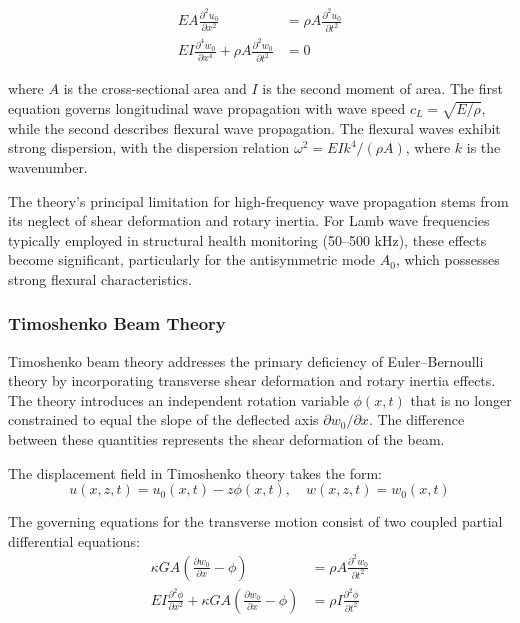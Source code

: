 \documentclass[12pt,a4paper]{report}
\begin{document}
\begin{align}
EA \frac{\partial^2 u_0}{\partial x^2} &= \rho A \frac{\partial^2 u_0}{\partial t^2} \label{eq:EB_axial}\\
EI \frac{\partial^4 w_0}{\partial x^4} + \rho A \frac{\partial^2 w_0}{\partial t^2} &= 0 \label{eq:EB_bending}
\end{align}

where $A$ is the cross-sectional area and $I$ is the second moment of area. The first equation governs longitudinal wave propagation with wave speed $c_L = \sqrt{E/\rho}$, while the second describes flexural wave propagation. The flexural waves exhibit strong dispersion, with the dispersion relation $\omega^2 = EI k^4 / (\rho A)$, where $k$ is the wavenumber.

The theory's principal limitation for high-frequency wave propagation stems from its neglect of shear deformation and rotary inertia. For Lamb wave frequencies typically employed in structural health monitoring (50--500 kHz), these effects become significant, particularly for the antisymmetric mode $A_0$, which possesses strong flexural characteristics.

\subsubsection{Timoshenko Beam Theory}

Timoshenko beam theory addresses the primary deficiency of Euler--Bernoulli theory by incorporating transverse shear deformation and rotary inertia effects. The theory introduces an independent rotation variable $\phi(x,t)$ that is no longer constrained to equal the slope of the deflected axis $\partial w_0/\partial x$. The difference between these quantities represents the shear deformation of the beam.

The displacement field in Timoshenko theory takes the form:
\begin{equation}
u(x,z,t) = u_0(x,t) - z \phi(x,t), \quad w(x,z,t) = w_0(x,t)
\end{equation}

The governing equations for the transverse motion consist of two coupled partial differential equations:
\begin{align}
\kappa GA \left(\frac{\partial w_0}{\partial x} - \phi\right) &= \rho A \frac{\partial^2 w_0}{\partial t^2} \label{eq:Tim_shear}\\
EI \frac{\partial^2 \phi}{\partial x^2} + \kappa GA \left(\frac{\partial w_0}{\partial x} - \phi\right) &= \rho I \frac{\partial^2 \phi}{\partial t^2} \label{eq:Tim_moment}
\end{align}
\end{document}
